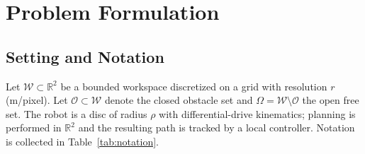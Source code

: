 \documentclass[conference]{IEEEtran}
\begin{document}
\section{Problem Formulation}
\label{sec:problem}
\subsection{Setting and Notation}
Let $\mathcal{W}\subset\mathbb{R}^2$ be a bounded workspace discretized on a grid with resolution $r$ (m/pixel). Let $\mathcal{O}\subset\mathcal{W}$ denote the closed obstacle set and $\Omega=\mathcal{W}\setminus\mathcal{O}$ the open free set. The robot is a disc of radius $\rho$ with differential-drive kinematics; planning is performed in $\mathbb{R}^2$ and the resulting path is tracked by a local controller. Notation is collected in Table~\ref{tab:notation}.
\end{document}
